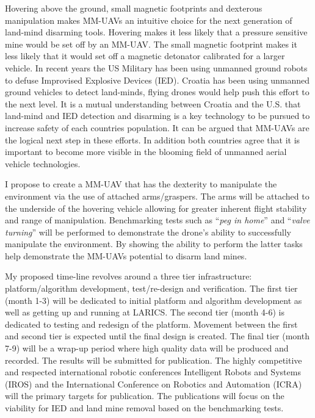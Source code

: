 \documentclass[12pt]{article}
\begin{document}
Hovering above the ground, small magnetic footprints and dexterous manipulation makes MM-UAVs an intuitive choice for the next generation of land-mind disarming tools.
Hovering makes it less likely that a pressure sensitive mine would be set off by an MM-UAV.
The small magnetic footprint makes it less likely that it would set off a magnetic detonator calibrated for a larger vehicle.
In recent years the US Military has been using unmanned ground robots to defuse Improvised Explosive Devices (IED).  
Croatia has been using unmanned ground vehicles to detect land-minds, flying drones would help push this effort to the next level. 
It is a mutual understanding between Croatia and the U.S. that land-mind and IED detection and disarming is a key technology to be pursued to increase safety of each countries population.
It can be argued that MM-UAVs are the logical next step in these efforts.
In addition both countries agree that it is important to become more visible in the blooming field of unmanned aerial vehicle technologies.

I propose to create a MM-UAV that has the dexterity to manipulate the environment via the use of attached arms/graspers.
The arms will be attached to the underside of the hovering vehicle allowing for greater inherent flight stability and range of manipulation.
Benchmarking tests such as ``\textit{peg in home}'' and ``\textit{valve turning}'' will be performed to demonstrate the drone's ability to successfully manipulate the environment. 
By showing the ability to perform the latter tasks help demonstrate the MM-UAVs potential to disarm land mines. 

My proposed time-line revolves around a three tier infrastructure: platform/algorithm development, test/re-design and verification.  
The first tier (month 1-3) will be dedicated to initial platform and algorithm development as well as getting up and running at LARICS.  
The second tier (month 4-6) is dedicated to testing and redesign of the platform.  
Movement between the first and second tier is expected until the final design is created.
The final tier (month 7-9) will be a wrap-up period where high quality data will be produced and recorded.
The results will be submitted for publication.  
The highly competitive and respected international robotic conferences Intelligent Robots and Systems (IROS) and the International Conference on Robotics and Automation (ICRA) will the primary targets for publication.  
The publications will focus on the viability for IED and land mine removal based on the benchmarking tests.
\end{document}

